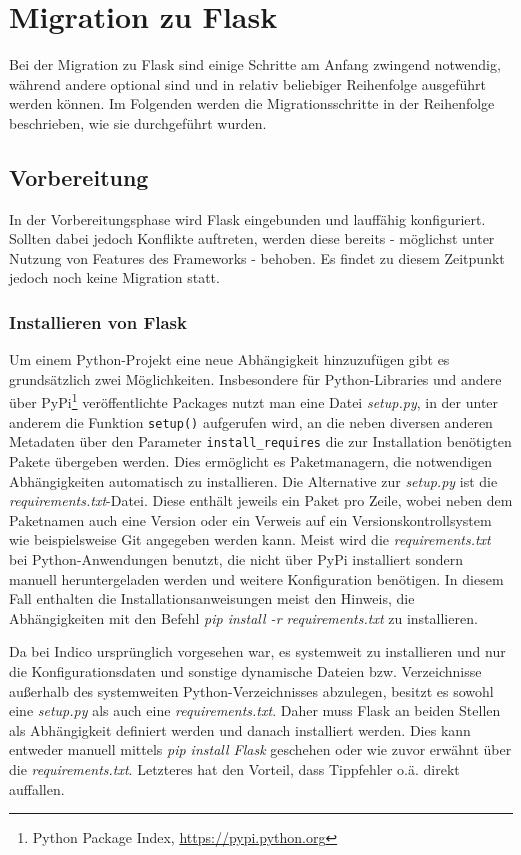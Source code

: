\chapter{Migration zu Flask}
Bei der Migration zu Flask sind einige Schritte am Anfang zwingend notwendig, während andere
optional sind und in relativ beliebiger Reihenfolge ausgeführt werden können. Im Folgenden
werden die Migrationsschritte in der Reihenfolge beschrieben, wie sie durchgeführt wurden.


\section{Vorbereitung}
In der Vorbereitungsphase wird Flask eingebunden und lauffähig konfiguriert. Sollten dabei jedoch
Konflikte auftreten, werden diese bereits - möglichst unter Nutzung von Features des Frameworks -
behoben. Es findet zu diesem Zeitpunkt jedoch noch keine Migration statt.


\subsection{Installieren von Flask}
Um einem Python-Projekt eine neue Abhängigkeit hinzuzufügen gibt es grundsätzlich zwei
Möglichkeiten. Insbesondere für Python-Libraries und andere über PyPi\footnote{Python Package Index,
\href{https://pypi.python.org}{https://pypi.python.org}} veröffentlichte Packages nutzt man eine
Datei \emph{setup.py}, in der unter anderem die Funktion \lstinline{setup()} aufgerufen wird, an die
neben diversen anderen Metadaten über den Parameter \lstinline{install_requires} die zur
Installation benötigten Pakete übergeben werden. Dies ermöglicht es Paketmanagern, die notwendigen
Abhängigkeiten automatisch zu installieren. Die Alternative zur \emph{setup.py} ist die
\emph{requirements.txt}-Datei. Diese enthält jeweils ein Paket pro Zeile, wobei neben dem Paketnamen
auch eine Version oder ein Verweis auf ein Versionskontrollsystem wie beispielsweise Git angegeben
werden kann. Meist wird die \emph{requirements.txt} bei Python-Anwendungen benutzt, die nicht über
PyPi installiert sondern manuell heruntergeladen werden und weitere Konfiguration benötigen. In
diesem Fall enthalten die Installationsanweisungen meist den Hinweis, die Abhängigkeiten mit den
Befehl \emph{pip install -r requirements.txt} zu installieren.

Da bei Indico ursprünglich vorgesehen war, es systemweit zu installieren und nur die
Konfigurationsdaten und sonstige dynamische Dateien bzw. Verzeichnisse außerhalb des systemweiten
Python-Verzeichnisses abzulegen, besitzt es sowohl eine \emph{setup.py} als auch eine
\emph{requirements.txt}. Daher muss Flask an beiden Stellen als Abhängigkeit definiert werden und
danach installiert werden. Dies kann entweder manuell mittels \emph{pip install Flask} geschehen
oder wie zuvor erwähnt über die \emph{requirements.txt}. Letzteres hat den Vorteil, dass Tippfehler
o.ä. direkt auffallen.

